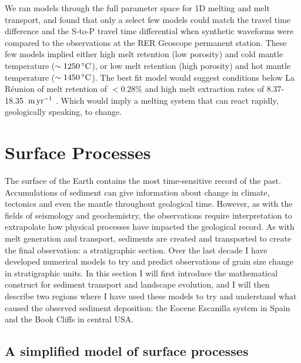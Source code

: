 We ran models through the full parameter space for 1D melting and melt transport, and found that only a select few models could match the travel time difference and the S-to-P travel time differential when synthetic waveforms were compared to the observations at the RER Geoscope permanent station. These few models implied either high melt retention (low porosity) and cold mantle temperature ($\sim 1250\rm\,^{\circ}C$), or low melt retention (high porosity) and hot mantle temperature ($\sim 1450\rm\,^{\circ}C$). The best fit model would suggest conditions below La Réunion of melt retention of $<$0.28\% and high melt extraction rates of 8.37-18.35 $\rm\,m\,yr^{-1}$ \citep{franken-etal-2020}. Which would imply a melting system that can react rapidly, geologically speaking, to change.

\section{Surface Processes}

The surface of the Earth contains the most time-sensitive record of the past. Accumulations of sediment can give information about change in climate, tectonics and even the mantle throughout geological time. However, as with the fields of seismology and geochemistry, the observations require interpretation to extrapolate how physical processes have impacted the geological record. As with melt generation and transport, sediments are created and transported to create the final observation: a stratigraphic section. Over the last decade I have developed numerical models to try and predict observations of grain size change in stratigraphic units. In this section I will first introduce the mathematical construct for sediment transport and landscape evolution, and I will then describe two regions where I have used these models to try and understand what caused the observed sediment deposition: the Eocene Escanilla system in Spain and the Book Cliffs in central USA.

\subsection{A simplified model of surface processes}

